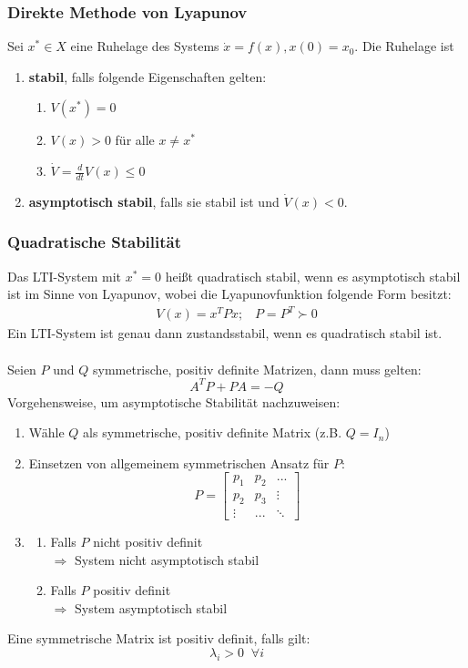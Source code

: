 \documentclass[a4paper,twocolumn,10pt]{article}
\begin{document}
\subsubsection{Direkte Methode von Lyapunov}
Sei $x^*\in X$ eine Ruhelage des Systems $\dot{x}=f(x),x(0)=x_0$.
Die Ruhelage ist
\begin{enumerate}[label=$\bullet$]
\item \textbf{stabil}, falls folgende Eigenschaften gelten:
\begin{enumerate}
\item $V(x^*)=0$
\item $V(x)>0$ für alle $x\neq x^*$
\item $\dot{V}=\frac{d}{dt}V(x)\leq 0$
\end{enumerate}
\item \textbf{asymptotisch stabil}, falls sie stabil ist und $\dot{V}(x)< 0$.
\end{enumerate}

\subsubsection{Quadratische Stabilität}
Das LTI-System mit $x^*=0$ heißt quadratisch stabil, wenn es asymptotisch stabil ist im Sinne von Lyapunov, wobei die Lyapunovfunktion folgende Form besitzt:
\begin{align*}
V(x)=x^TPx;\;\;\;P=P^T\succ 0
\end{align*}
Ein LTI-System ist genau dann zustandsstabil, wenn es quadratisch stabil ist.\\\\
Seien $P$ und $Q$ symmetrische, positiv definite Matrizen, dann muss gelten:
\begin{equation*}
A^TP+PA=-Q
\end{equation*}
Vorgehensweise, um asymptotische Stabilität nachzuweisen:
\begin{enumerate}
\item Wähle $Q$ als symmetrische, positiv definite Matrix (z.B. $Q=I_n$)
\item Einsetzen von allgemeinem symmetrischen Ansatz für $P$:
\begin{equation*}
P=\begin{bmatrix}p_1 & p_2 & ... \\ p_2 & p_3 & \vdots \\ \vdots & ... & \ddots\end{bmatrix}
\end{equation*}
\item
\begin{enumerate}[label=$\bullet$]
\item Falls $P$ nicht positiv definit\\
$\Rightarrow$ System nicht asymptotisch stabil
\item Falls $P$ positiv definit\\
$\Rightarrow$ System asymptotisch stabil
\end{enumerate}
\end{enumerate}
Eine symmetrische Matrix ist positiv definit, falls gilt:
\begin{equation*}
\lambda_i>0\;\;\forall i
\end{equation*}
\end{document}
